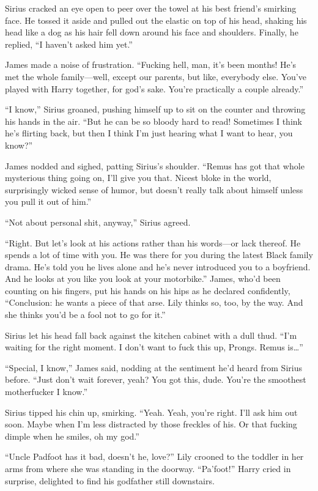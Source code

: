 Sirius cracked an eye open to peer over the towel at his best friend’s smirking face. He tossed it aside and pulled out the elastic on top of his head, shaking his head like a dog as his hair fell down around his face and shoulders. Finally, he replied, “I haven’t asked him yet.”

James made a noise of frustration. “Fucking hell, man, it’s been months! He’s met the whole family—well, except our parents, but like, everybody else. You’ve played with Harry together, for god’s sake. You’re practically a couple already.”

“I know,” Sirius groaned, pushing himself up to sit on the counter and throwing his hands in the air. “But he can be so bloody hard to read! Sometimes I think he’s flirting back, but then I think I’m just hearing what I want to hear, you know?”

James nodded and sighed, patting Sirius’s shoulder. “Remus has got that whole mysterious thing going on, I’ll give you that. Nicest bloke in the world, surprisingly wicked sense of humor, but doesn’t really talk about himself unless you pull it out of him.”

“Not about personal shit, anyway,” Sirius agreed.

“Right. But let’s look at his actions rather than his words—or lack thereof. He spends a lot of time with you. He was there for you during the latest Black family drama. He’s told you he lives alone and he’s never introduced you to a boyfriend. And he looks at you like you look at your motorbike.” James, who’d been counting on his fingers, put his hands on his hips as he declared confidently, “Conclusion: he wants a piece of that arse. Lily thinks so, too, by the way. And she thinks you’d be a fool not to go for it.”

Sirius let his head fall back against the kitchen cabinet with a dull thud. “I’m waiting for the right moment. I don’t want to fuck this up, Prongs. Remus is…”

“Special, I know,” James said, nodding at the sentiment he’d heard from Sirius before. “Just don’t wait forever, yeah? You got this, dude. You’re the smoothest motherfucker I know.”

Sirius tipped his chin up, smirking. “Yeah. Yeah, you’re right. I’ll ask him out soon. Maybe when I’m less distracted by those freckles of his. Or that fucking dimple when he smiles, oh my god.”

“Uncle Padfoot has it bad, doesn’t he, love?” Lily crooned to the toddler in her arms from where she was standing in the doorway. “Pa’foot!” Harry cried in surprise, delighted to find his godfather still downstairs.

